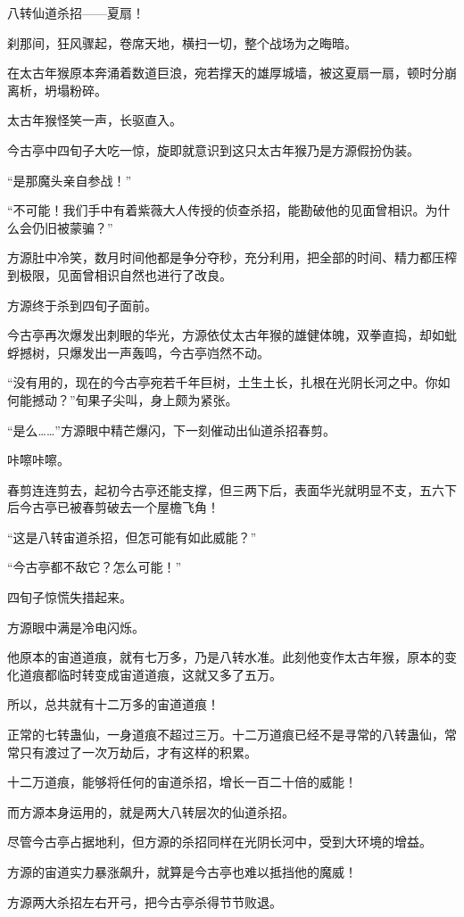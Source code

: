 \begin{this_body}
八转仙道杀招——夏扇！

刹那间，狂风骤起，卷席天地，横扫一切，整个战场为之晦暗。

在太古年猴原本奔涌着数道巨浪，宛若撑天的雄厚城墙，被这夏扇一扇，顿时分崩离析，坍塌粉碎。

太古年猴怪笑一声，长驱直入。

今古亭中四旬子大吃一惊，旋即就意识到这只太古年猴乃是方源假扮伪装。

“是那魔头亲自参战！”

“不可能！我们手中有着紫薇大人传授的侦查杀招，能勘破他的见面曾相识。为什么会仍旧被蒙骗？”

方源肚中冷笑，数月时间他都是争分夺秒，充分利用，把全部的时间、精力都压榨到极限，见面曾相识自然也进行了改良。

方源终于杀到四旬子面前。

今古亭再次爆发出刺眼的华光，方源依仗太古年猴的雄健体魄，双拳直捣，却如蚍蜉撼树，只爆发出一声轰鸣，今古亭岿然不动。

“没有用的，现在的今古亭宛若千年巨树，土生土长，扎根在光阴长河之中。你如何能撼动？”旬果子尖叫，身上颇为紧张。

“是么……”方源眼中精芒爆闪，下一刻催动出仙道杀招春剪。

咔嚓咔嚓。

春剪连连剪去，起初今古亭还能支撑，但三两下后，表面华光就明显不支，五六下后今古亭已被春剪破去一个屋檐飞角！

“这是八转宙道杀招，但怎可能有如此威能？”

“今古亭都不敌它？怎么可能！”

四旬子惊慌失措起来。

方源眼中满是冷电闪烁。

他原本的宙道道痕，就有七万多，乃是八转水准。此刻他变作太古年猴，原本的变化道痕都临时转变成宙道道痕，这就又多了五万。

所以，总共就有十二万多的宙道道痕！

正常的七转蛊仙，一身道痕不超过三万。十二万道痕已经不是寻常的八转蛊仙，常常只有渡过了一次万劫后，才有这样的积累。

十二万道痕，能够将任何的宙道杀招，增长一百二十倍的威能！

而方源本身运用的，就是两大八转层次的仙道杀招。

尽管今古亭占据地利，但方源的杀招同样在光阴长河中，受到大环境的增益。

方源的宙道实力暴涨飙升，就算是今古亭也难以抵挡他的魔威！

方源两大杀招左右开弓，把今古亭杀得节节败退。


\end{this_body}
